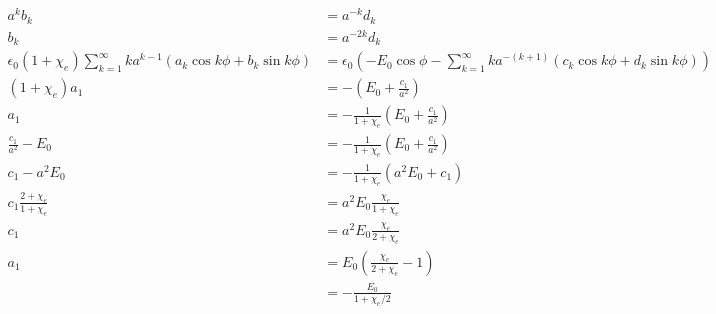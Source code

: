 \documentclass{article}
\begin{document}
\begin{align*}
  a^k b_k                                                                                     & = a^{-k} d_k                                                                                                        \\
  b_k                                                                                         & = a^{-2 k} d_k                                                                                                      \\
  \epsilon_0 (1 + \chi_e) \sum_{k = 1}^\infty k a^{k - 1} (a_k \cos k \phi + b_k \sin k \phi) & = \epsilon_0 \left( -E_0 \cos \phi - \sum_{k = 1}^\infty k a^{-(k + 1)} (c_k \cos k \phi + d_k \sin k \phi) \right) \\
  (1 + \chi_e) a_1                                                                            & = -\left( E_0 + \frac{c_1}{a^2} \right)                                                                             \\
  a_1                                                                                         & = -\frac{1}{1 + \chi_e} \left( E_0 + \frac{c_1}{a^2} \right)                                                        \\
  \frac{c_1}{a^2} - E_0                                                                       & = -\frac{1}{1 + \chi_e} \left( E_0 + \frac{c_1}{a^2} \right)                                                        \\
  c_1 - a^2 E_0                                                                               & = -\frac{1}{1 + \chi_e} (a^2 E_0 + c_1)                                                                             \\
  c_1 \frac{2 + \chi_e}{1 + \chi_e}                                                           & = a^2 E_0 \frac{\chi_e}{1 + \chi_e}                                                                                 \\
  c_1                                                                                         & = a^2 E_0 \frac{\chi_e}{2 + \chi_e}                                                                                 \\
  a_1                                                                                         & = E_0 \left( \frac{\chi_e}{2 + \chi_e} - 1 \right)                                                                  \\
                                                                                              & = -\frac{E_0}{1 + \chi_e / 2}
\end{align*}
\end{document}
